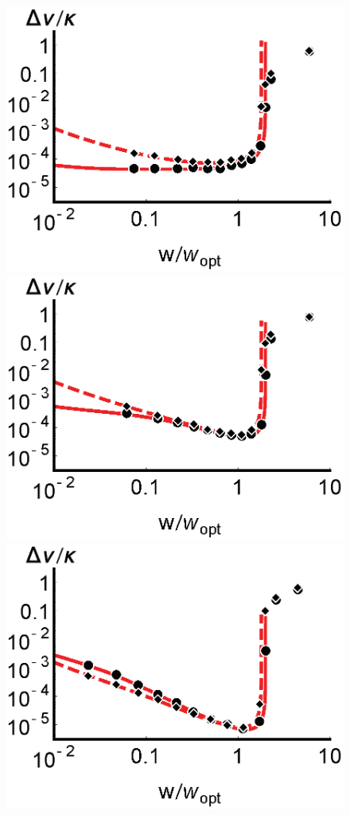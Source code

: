 \documentclass[aps,
twocolumn,
showpacs,
superscriptaddress,groupedaddress]{revtex4}
\begin{document}
\begin{figure}
\begin{center}
	\includegraphics[scale =0.51] {N10000LWS.eps}
	\hspace{-5.5mm} \includegraphics[scale =0.51] {N10000LWC.eps}
	\hspace{-5.5mm} \includegraphics[scale =0.51] {N10000LWL.eps}\\

\end{center}
\end{figure}
\end{document}
